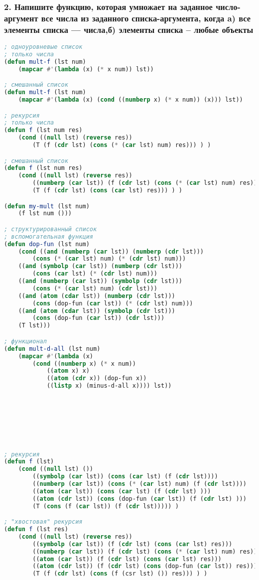 \newpage
\subsubsection*{2. Напишите функцию, которая умножает на заданное число-аргумент все числа из заданного списка-аргумента, когда \newline a) все элементы списка --- числа,\newline б) элементы списка -- любые объекты}

\begin{lstlisting}[language=Lisp]
; одноуровневые список
; только числа
(defun mult-f (lst num)
	(mapcar #'(lambda (x) (* x num)) lst))

; смешанный список
(defun mult-f (lst num)
	(mapcar #'(lambda (x) (cond ((numberp x) (* x num)) (x))) lst))

; рекурсия
; только числа
(defun f (lst num res)
	(cond ((null lst) (reverse res))
		(T (f (cdr lst) (cons (* (car lst) num) res))) ) )

; смешанный список
(defun f (lst num res)
	(cond ((null lst) (reverse res))
		((numberp (car lst)) (f (cdr lst) (cons (* (car lst) num) res)))
		(T (f (cdr lst) (cons (car lst) res))) ) )

(defun my-mult (lst num)
	(f lst num ()))

; структурированный список
; вспомогательная функция
(defun dop-fun (lst num)
	(cond ((and (numberp (car lst)) (numberp (cdr lst))) 
		(cons (* (car lst) num) (* (cdr lst) num)))
	((and (symbolp (car lst)) (numberp (cdr lst))) 
		(cons (car lst) (* (cdr lst) num)))
	((and (numberp (car lst)) (symbolp (cdr lst)))
		(cons (* (car lst) num) (cdr lst)))
	((and (atom (cdar lst)) (numberp (cdr lst))) 
		(cons (dop-fun (car lst)) (* (cdr lst) num)))
	((and (atom (cdar lst)) (symbolp (cdr lst))) 
		(cons (dop-fun (car lst)) (cdr lst)))
	(T lst)))

; функционал
(defun mult-d-all (lst num)
	(mapcar #'(lambda (x) 
		(cond ((numberp x) (* x num))
			((atom x) x)
			((atom (cdr x)) (dop-fun x))
			((listp x) (minus-d-all x)))) lst))


	
	
	
	
	
	
; рекурсия
(defun f (lst)
	(cond ((null lst) ())
		((symbolp (car lst)) (cons (car lst) (f (cdr lst))))
		((numberp (car lst)) (cons (* (car lst) num) (f (cdr lst))))
		((atom (car lst)) (cons (car lst) (f (cdr lst) )))
		((atom (cdr lst)) (cons (dop-fun (car lst)) (f (cdr lst) )))
		(T (cons (f (car lst)) (f (cdr lst))))) )

; "хвостовая" рекурсия
(defun f (lst res)
	(cond ((null lst) (reverse res))
		((symbolp (car lst)) (f (cdr lst) (cons (car lst) res)))
		((numberp (car lst)) (f (cdr lst) (cons (* (car lst) num) res)))
		((atom (car lst)) (f (cdr lst) (cons (car lst) res)))
		((atom (cdr lst)) (f (cdr lst) (cons (dop-fun (car lst)) res)))
		(T (f (cdr lst) (cons (f (csr lst) ()) res))) ) )

\end{lstlisting}


